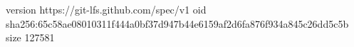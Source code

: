 version https://git-lfs.github.com/spec/v1
oid sha256:65c58ae08010311f444a0bf37d947b44e6159af2d6fa876f934a845c26dd5c5b
size 127581
